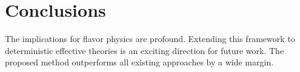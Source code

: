 \section{Conclusions}\label{sec:conclusions}

The implications for flavor physics are profound. Extending this
framework to deterministic effective theories is an exciting direction
for future work. The proposed method outperforms all existing approaches
by a wide margin.

